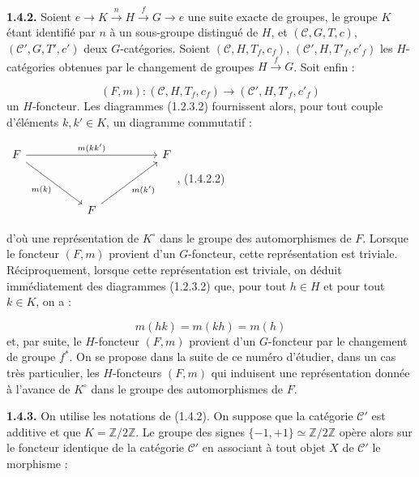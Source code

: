 %
\noindent\textbf{1.4.2.}\quad
Soient
$e\to K\xrightarrow{n}H\xrightarrow{f}G\to e$ une suite exacte de
groupes, le groupe $K$ étant identifié par $n$ à un sous-groupe
distingué de $H$, et $(\mathcal C,G,T,c)$,
$(\mathcal C',G,T',c')$ deux $G$-catégories. Soient
$(\mathcal C,H,T_f,c_f)$, $(\mathcal C',H,T'_f,c'_f)$ les
$H$-catégories obtenues par le changement de groupes
$H\xrightarrow{f}G$. Soit enfin :

\begin{equation}
  (F,m)\colon(\mathcal C,H,T_f,c_f)
  \longrightarrow(\mathcal C',H,T'_f,c'_f)
  \tag{1.4.2.1}
\end{equation}
un $H$-foncteur. Les diagrammes (1.2.3.2) fournissent alors, pour tout
couple d'éléments $k,k'\in K$, un diagramme commutatif :

\begin{center}
  $\begin{tikzcd}[ampersand replacement=\&,column sep=5em,row sep=3.5em]
    F \arrow[rr,"{m(kk')}"] \arrow[dr,"{m(k)}"']
      \& \& F \\
      \& F \arrow[ur,"{m(k')}"'] \&
  \end{tikzcd}$,
  \hfill\textup{(1.4.2.2)}
\end{center}

d'où une représentation de $K^\circ$ dans le groupe des
automorphismes de $F$. Lorsque le foncteur $(F,m)$ provient d'un
$G$-foncteur, cette représentation est triviale. Réciproquement,
lorsque cette représentation est triviale, on déduit immédiatement des
diagrammes (1.2.3.2) que, pour tout $h\in H$ et pour tout $k\in K$, on
a :

\begin{equation}
  m(hk)=m(kh)=m(h)
  \tag{1.4.2.3}
\end{equation}
et, par suite, le $H$-foncteur $(F,m)$ provient d'un $G$-foncteur par
le changement de groupe $f^*$. On se propose dans la suite de ce numéro
d'étudier, dans un cas très particulier, les $H$-foncteurs $(F,m)$ qui
induisent une représentation donnée à l'avance de $K^\circ$ dans le
groupe des automorphismes de $F$.

\noindent\textbf{1.4.3.}\quad
On utilise les notations de (1.4.2). On suppose que la catégorie
$\mathcal C'$ est additive et que $K=\mathbb Z/2\mathbb Z$. Le groupe
des signes $\{-1,+1\}\simeq\mathbb Z/2\mathbb Z$ opère alors sur le
foncteur identique de la catégorie $\mathcal C'$ en associant à tout
objet $X$ de $\mathcal C'$ le morphisme :

